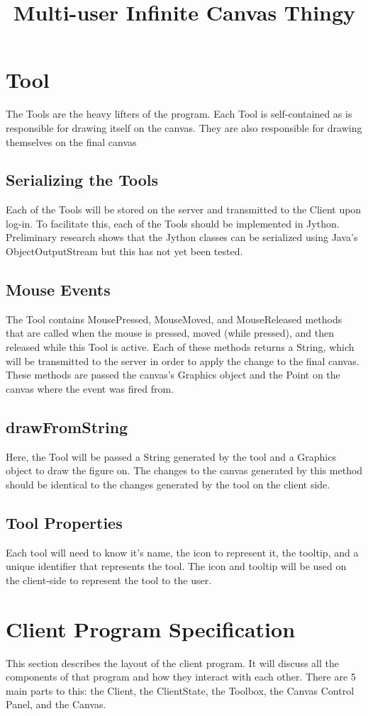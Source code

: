 \documentclass[12pt]{article}
\title{Multi-user Infinite Canvas Thingy}
\begin{document}
 \maketitle
 \section{Tool}
 The Tools are the heavy lifters of the program. Each Tool is self-contained as
 is responsible for drawing itself on the canvas. They are also responsible for
 drawing themselves on the final canvas
 \subsection{Serializing the Tools}
 Each of the Tools will be stored on the server and transmitted to the Client
 upon log-in. To facilitate this, each of the Tools should be implemented in
 Jython. Preliminary research shows that the Jython classes can be serialized using Java's
 ObjectOutputStream but this has not yet been tested.
 \subsection{Mouse Events}
 The Tool contains MousePressed, MouseMoved, and MouseReleased methods that are
 called when the mouse is pressed, moved (while pressed), and then released
 while this Tool is active. Each of these methods returns a String, which will
 be transmitted to the server in order to apply the change to the final canvas.
 These methods are passed the canvas's Graphics object and the Point on the
 canvas where the event was fired from.

 \subsection{drawFromString}
Here, the Tool will be passed a String generated by the tool and a Graphics
object to draw the figure on. The changes to the canvas generated by this method should be
identical to the changes generated by the tool on the client side.
\subsection{Tool Properties}
Each tool will need to know it's name, the icon to represent it, the tooltip,
and a unique identifier that represents the tool. The icon and tooltip will be
used on the client-side to represent the tool to the user.

\section{Client Program Specification}
 This section describes the layout of the client program. It will discuss all
 the components of that program and how they interact with each other. There
 are 5 main parts to this: the Client, the ClientState, the Toolbox, the
 Canvas Control Panel, and the Canvas.
\end{document}
